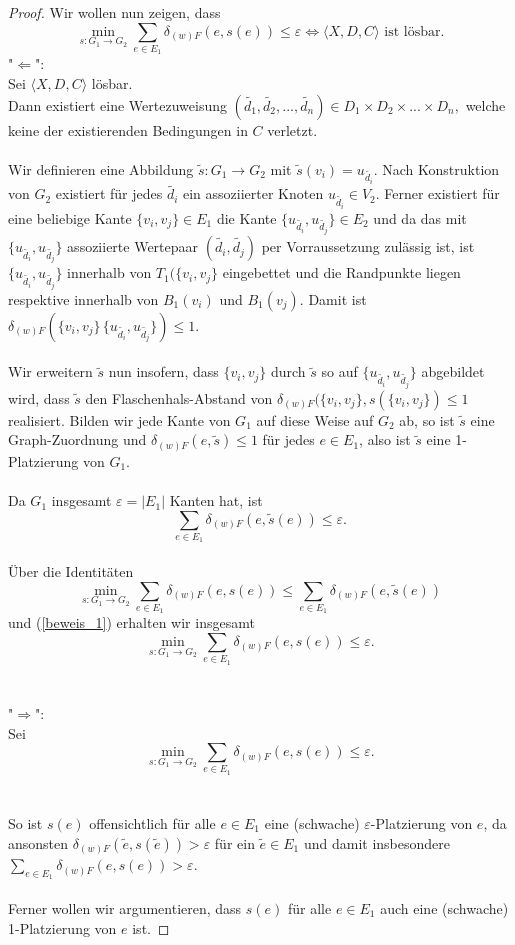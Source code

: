 \documentclass[a4paper, 12pt, twoside]{article}
\theoremstyle{Format1} %
\begin{document}
\begin{proof}
Wir wollen nun zeigen, dass
$$ \min_{s: G_1 \to G_2} \sum_{e \in E_1} \delta_{(w)F}(e, s(e)) \leq \varepsilon \iff \langle X,D,C \rangle \text{ ist lösbar}.$$
"$\Leftarrow$":
\\
Sei $\langle X,D,C \rangle$ lösbar.
\\
Dann existiert eine Wertezuweisung $(\tilde{d_1},\tilde{d_2},...,\tilde{d_n}) \in {D_1 \times D_2 \times ... \times D_n},$ welche keine der existierenden Bedingungen in $C$ verletzt.
\\
\\
Wir definieren eine Abbildung $\tilde{s}:G_1 \to G_2$ mit $\tilde{s}(v_i) = u_{\tilde{d_i}}$.
Nach Konstruktion von $G_2$ existiert für jedes $\tilde{d_i}$ ein assoziierter Knoten $u_{\tilde{d_i}} \in V_2$.
Ferner existiert für eine beliebige Kante $\{v_i, v_j\} \in E_1$ die Kante $\{u_{\tilde{d_i}}, u_{\tilde{d_j}}\} \in E_2$
und da das mit $\{u_{\tilde{d_i}}, u_{\tilde{d_j}}\}$ assoziierte Wertepaar $(\tilde{d_i},\tilde{d_j})$ per Vorraussetzung zulässig ist,
ist $\{u_{\tilde{d_i}}, u_{\tilde{d_j}}\}$ innerhalb von $T_1(\{v_i, v_j\}$ eingebettet und die Randpunkte liegen respektive innerhalb von $B_1(v_i)$ und $B_1(v_j)$.
Damit ist $\delta_{(w)F}(\{v_i, v_j\}\,\{u_{\tilde{d_i}}, u_{\tilde{d_j}}\}) \leq 1$.
\\
\\
Wir erweitern $\tilde{s}$ nun insofern, dass $\{v_i, v_j\}$ durch $\tilde{s}$ so auf $\{u_{\tilde{d_i}}, u_{\tilde{d_j}}\}$ abgebildet wird,
dass $\tilde{s}$ den Flaschenhals-Abstand von $\delta_{(w)F}(\{v_i, v_j\}, s(\{v_i, v_j\}) \leq 1$ realisiert.
Bilden wir jede Kante von $G_1$ auf diese Weise auf $G_2$ ab, so ist $\tilde{s}$ eine Graph-Zuordnung und $\delta_{(w)F}(e, \tilde{s}) \leq 1$ für jedes $e \in E_1$,
also ist $\tilde{s}$ eine 1-Platzierung von $G_1$.
\\
\\
Da $G_1$ insgesamt $\varepsilon = |E_1|$ Kanten hat, ist
\begin{equation} \label{beweis_1}
	\sum_{e \in E_1} \delta_{(w)F}(e, \tilde{s}(e)) \leq \varepsilon.
\end{equation}
\\
Über die Identitäten $$\min_{s: G_1 \to G_2} \sum_{e \in E_1} \delta_{(w)F}(e, s(e)) \leq \sum_{e \in E_1} \delta_{(w)F}(e,\tilde{s}(e)) $$
und (\ref{beweis_1}) erhalten wir insgesamt
$$\min_{s: G_1 \to G_2} \sum_{e \in E_1} \delta_{(w)F}(e, s(e)) \leq \varepsilon .$$
\\
\\
"$\Rightarrow$":
\\
Sei $$\min_{s: G_1 \to G_2} \sum_{e \in E_1} \delta_{(w)F}(e, s(e)) \leq {\varepsilon}.$$
\\
\\
So ist $s(e)$ offensichtlich für alle $e \in E_1$ eine (schwache) $\varepsilon$-Platzierung von $e$,
da ansonsten $\delta_{(w)F}(\tilde{e}, s(\tilde{e})) > \varepsilon$ für ein $\tilde{e} \in E_1$
und damit insbesondere $\sum_{{e}\in E_1} \delta_{(w)F}(e, s(e)) > \varepsilon$.
\\
\\
Ferner wollen wir argumentieren, dass $s(e)$ für alle $e \in E_1$ auch eine (schwache) 1-Platzierung von $e$ ist.


\end{proof}
\end{document}
